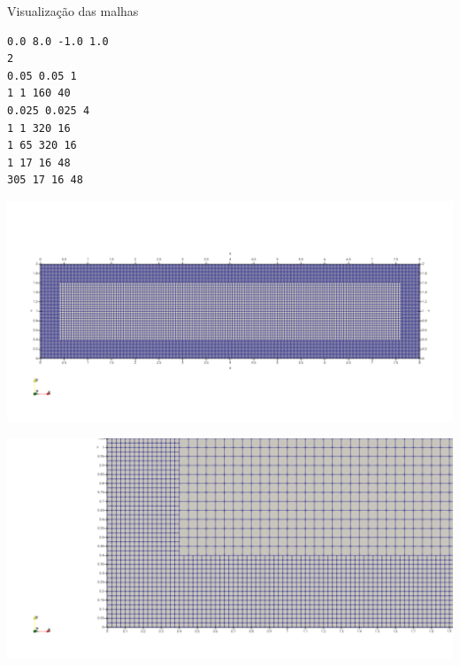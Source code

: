 \documentclass[../main/main.tex]{subfiles}
\begin{document}
\begin{frame}[fragile]{Visualização das malhas}
    \begin{center}
        \begin{minipage}{0.30\textwidth}
            {\footnotesize
                \begin{verbatim}
0.0 8.0 -1.0 1.0
2
0.05 0.05 1
1 1 160 40
0.025 0.025 4
1 1 320 16
1 65 320 16
1 17 16 48
305 17 16 48
                \end{verbatim}
            }
        \end{minipage}
        \hfill
        \begin{minipage}{0.65\textwidth}
            \includegraphics[width=\textwidth]{imgs/ref2.png}

            \includegraphics[height=0.3\textheight]{imgs/ref2_border.png}
        \end{minipage}
    \end{center}
\end{frame}
\end{document}
